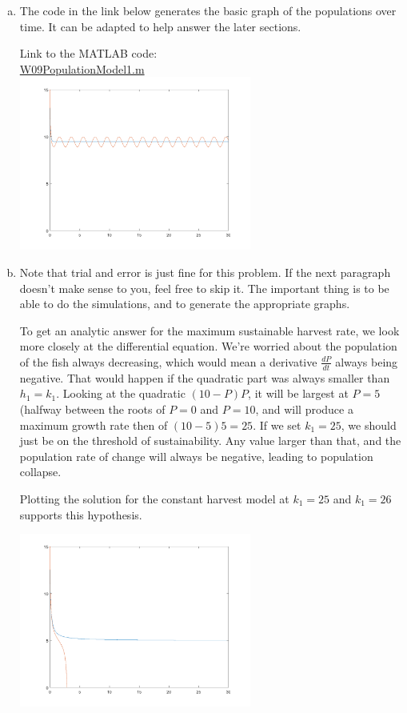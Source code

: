 \begin{enumerate}[1.]
\begin{Solution}
\begin{enumerate}[(a)]
\item  The code in the link below generates the basic graph of the populations over time.  It can be adapted to help answer the later sections.

  Link to the MATLAB code: \\
  \href{http://www.mast.queensu.ca/~apsc171/MNTCP01/PracticeProblems/MATLAB/W09PopulationModel1.m}{W09PopulationModel1.m} \\

\includegraphics[width=3in]{graphics/Week09_PopulationModels/population_harvesting_1a}

\item Note that trial and error is just fine for this problem.  If the
  next paragraph doesn't make sense to you, feel free to skip it.  The
  important thing is to be able to do the simulations, and to generate
  the appropriate graphs.

  To get an analytic answer for the maximum sustainable harvest rate,
  we look more closely at the differential equation. We're worried
  about the population of the fish always decreasing, which would mean
  a derivative $\frac{dP}{dt}$ always being negative.  That would
  happen if the quadratic part was always smaller than $h_1 = k_1$.
  Looking at the quadratic $(10-P)P$, it will be largest at $P= 5$
  (halfway between the roots of $P=0$ and $P=10$, and will produce a
  maximum growth rate then of $(10 - 5)5 = 25$.  If we set $k_1 = 25$,
  we should just be on the threshold of sustainability.  Any value
  larger than that, and the population rate of change will always be
  negative, leading to population collapse.

  Plotting the solution for the constant harvest model at $k_1 = 25$
  and $k_1 = 26$ supports this hypothesis.
\begin{center}
\includegraphics[width=3in]{graphics/Week09_PopulationModels/population_harvesting_1b}
\end{center}


\end{enumerate}
\end{Solution}
\end{enumerate}
